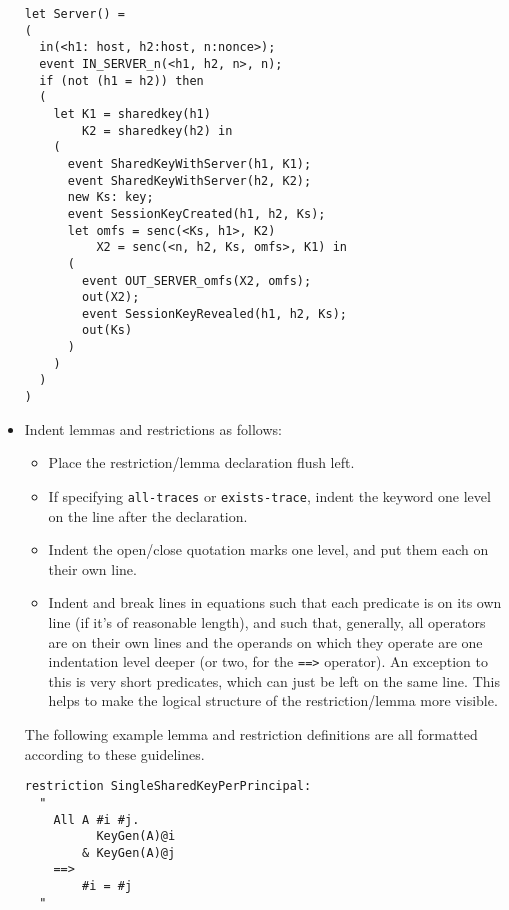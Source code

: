 \begin{itemize}
\begin{center}
\begin{minipage}{0.7\linewidth}
\begin{lstlisting}
let Server() = 
(
  in(<h1: host, h2:host, n:nonce>);
  event IN_SERVER_n(<h1, h2, n>, n);
  if (not (h1 = h2)) then 
  (
    let K1 = sharedkey(h1)
        K2 = sharedkey(h2) in 
    (
      event SharedKeyWithServer(h1, K1);
      event SharedKeyWithServer(h2, K2);
      new Ks: key;
      event SessionKeyCreated(h1, h2, Ks);
      let omfs = senc(<Ks, h1>, K2)
          X2 = senc(<n, h2, Ks, omfs>, K1) in 
      (
        event OUT_SERVER_omfs(X2, omfs);
        out(X2);
        event SessionKeyRevealed(h1, h2, Ks);
        out(Ks)
      )
    )
  )
)
\end{lstlisting}
\end{minipage}
\end{center}

\item Indent lemmas and restrictions as follows:

\begin{itemize}

    \item Place the restriction/lemma declaration flush left.

    \item If specifying \texttt{all-traces} or \texttt{exists-trace}, indent the keyword one level on the line after the declaration.

    \item Indent the open/close quotation marks one level, and put them each on their own line.

    \item Indent and break lines in equations such that each predicate is on its own line (if it's of reasonable length), and such that, generally, all operators are on their own lines and the operands on which they operate are one indentation level deeper (or two, for the \texttt{==>} operator). An exception to this is very short predicates, which can just be left on the same line. This helps to make the logical structure of the restriction/lemma more visible.
    
\end{itemize}

The following example lemma and restriction definitions are all formatted according to these guidelines.

\begin{center}
\begin{minipage}{0.6\linewidth}
\begin{lstlisting}
restriction SingleSharedKeyPerPrincipal:
  "
    All A #i #j.
          KeyGen(A)@i
        & KeyGen(A)@j
    ==>
        #i = #j
  "
\end{lstlisting}
\end{minipage}
\end{center}


\end{itemize}
